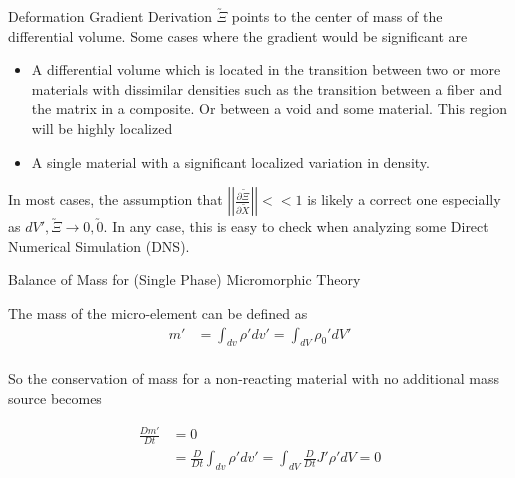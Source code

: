 \documentclass[11pt]{beamer}
\newcommand{\VEC}[1]{\utilde{#1}}
\newcommand{\LTN}[1]{\left|\left| #1 \right|\right|}
\begin{document}
\begin{frame}{Deformation Gradient Derivation}
$\VEC{\Xi}$ points to the center of mass of the differential volume. Some cases where the gradient would be significant are
\begin{itemize}
\item A differential volume which is located in the transition between two or more materials with dissimilar densities such as the transition between a fiber and the matrix in a composite. Or between a void and some material. This region will be highly localized
\item A single material with a significant localized variation in density.
\end{itemize}
In most cases, the assumption that $\LTN{\frac{\partial \VEC{\Xi}}{\partial \VEC{X}}}<<1$ is likely a correct one especially as $dV',\VEC{\Xi} \to 0,\VEC{0}$. In any case, this is easy to check when analyzing some Direct Numerical Simulation (DNS).
\end{frame}

%
%
%
%
%
%

\begin{frame}{Balance of Mass for (Single Phase) Micromorphic Theory}

The mass of the micro-element can be defined as
\begin{align*}
m' &= \int_{dv} \rho' dv' = \int_{dV} \rho_0' dV'\\
\end{align*}

So the conservation of mass for a non-reacting material with no additional mass source becomes

\begin{align*}
\frac{Dm'}{Dt} &= 0\\
&= \frac{D}{Dt} \int_{dv} \rho' dv' = \int_{dV} \frac{D}{Dt} J' \rho' dV = 0\\
\end{align*}

\end{frame}
\end{document}
